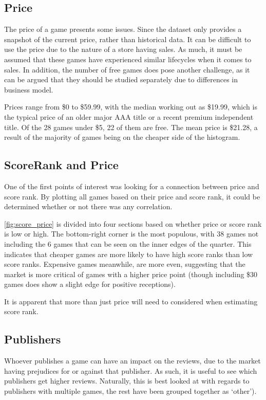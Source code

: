 \documentclass[dataset.tex]{subfiles}
\begin{document}
\subsection{Price} %
\label{sub:price}
The price of a game presents some issues. Since the dataset only provides a
snapshot of the current price, rather than historical data. It can be difficult
to use the price due to the nature of a store having sales. As much, it must be
assumed that these games have experienced similar lifecycles when it comes to
sales. In addition, the number of free games does pose another challenge, as it
can be argued that they should be studied separately due to differences in
business model.

Prices range from \$0 to \$59.99, with the median working out as \$19.99, which
is the typical price of an older major AAA title or a recent premium independent
title. Of the 28 games under \$5, 22 of them are free. The mean price is
\$21.28, a result of the majority of games being on the cheaper side of the
histogram.

\subsection{ScoreRank and Price} %
\label{sub:scorerank_and_price}
One of the first points of interest was looking for a connection between price
and score rank. By plotting all games based on their price and score rank, it
could be determined whether or not there was any correlation.

\autoref{fig:score_price} is divided into four sections based on whether price
or score rank is low or high. The bottom-right corner is the most populous, with
38 games not including the 6 games that can be seen on the inner edges of the
quarter. This indicates that cheaper games are more likely to have high score
ranks than low score ranks. Expensive games meanwhile, are more even, suggesting
that the market is more critical of games with a higher price point (though
including \$30 games does show a slight edge for positive receptions).

It is apparent that more than just price will need to considered when estimating
score rank.

\subsection{Publishers} %
\label{sub:publishers}
Whoever publishes a game can have an impact on the reviews, due to the market
having prejudices for or against that publisher. As such, it is useful to see
which publishers get higher reviews. Naturally, this is best looked at with
regards to publishers with multiple games, the rest have been grouped together
as `other').
\end{document}
